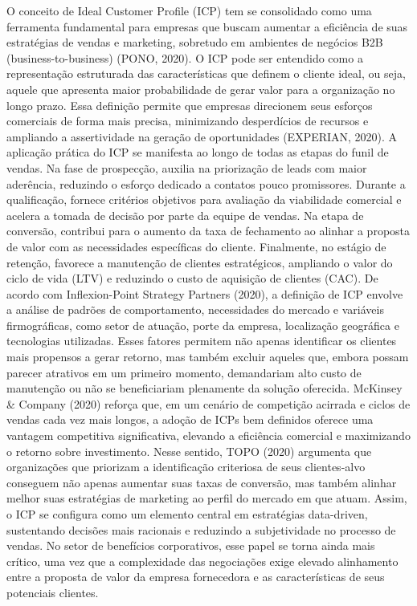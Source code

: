 O conceito de Ideal Customer Profile (ICP) tem se consolidado como uma ferramenta fundamental para empresas que buscam aumentar a eficiência de suas estratégias de vendas e marketing, sobretudo em ambientes de negócios B2B (business-to-business) (PONO, 2020). O ICP pode ser entendido como a representação estruturada das características que definem o cliente ideal, ou seja, aquele que apresenta maior probabilidade de gerar valor para a organização no longo prazo. Essa definição permite que empresas direcionem seus esforços comerciais de forma mais precisa, minimizando desperdícios de recursos e ampliando a assertividade na geração de oportunidades (EXPERIAN, 2020).
A aplicação prática do ICP se manifesta ao longo de todas as etapas do funil de vendas. Na fase de prospecção, auxilia na priorização de leads com maior aderência, reduzindo o esforço dedicado a contatos pouco promissores. Durante a qualificação, fornece critérios objetivos para avaliação da viabilidade comercial e acelera a tomada de decisão por parte da equipe de vendas. Na etapa de conversão, contribui para o aumento da taxa de fechamento ao alinhar a proposta de valor com as necessidades específicas do cliente. Finalmente, no estágio de retenção, favorece a manutenção de clientes estratégicos, ampliando o valor do ciclo de vida (LTV) e reduzindo o custo de aquisição de clientes (CAC).
De acordo com Inflexion-Point Strategy Partners (2020), a definição de ICP envolve a análise de padrões de comportamento, necessidades do mercado e variáveis firmográficas, como setor de atuação, porte da empresa, localização geográfica e tecnologias utilizadas. Esses fatores permitem não apenas identificar os clientes mais propensos a gerar retorno, mas também excluir aqueles que, embora possam parecer atrativos em um primeiro momento, demandariam alto custo de manutenção ou não se beneficiariam plenamente da solução oferecida. McKinsey \& Company (2020) reforça que, em um cenário de competição acirrada e ciclos de vendas cada vez mais longos, a adoção de ICPs bem definidos oferece uma vantagem competitiva significativa, elevando a eficiência comercial e maximizando o retorno sobre investimento.
Nesse sentido, TOPO (2020) argumenta que organizações que priorizam a identificação criteriosa de seus clientes-alvo conseguem não apenas aumentar suas taxas de conversão, mas também alinhar melhor suas estratégias de marketing ao perfil do mercado em que atuam. Assim, o ICP se configura como um elemento central em estratégias data-driven, sustentando decisões mais racionais e reduzindo a subjetividade no processo de vendas. No setor de benefícios corporativos, esse papel se torna ainda mais crítico, uma vez que a complexidade das negociações exige elevado alinhamento entre a proposta de valor da empresa fornecedora e as características de seus potenciais clientes.

